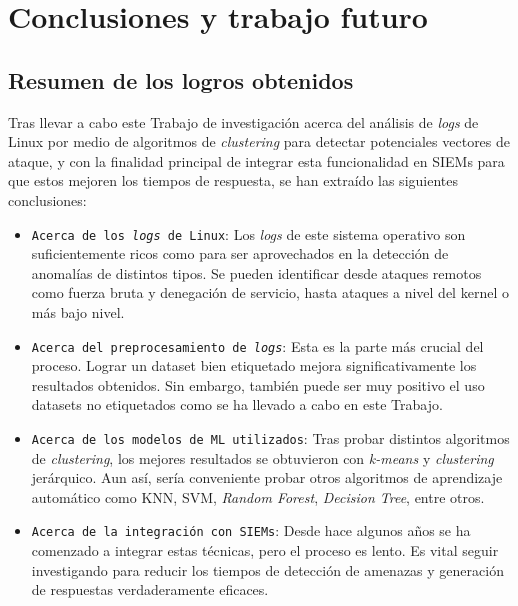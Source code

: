 \chapter{Conclusiones y trabajo futuro}


\vspace{-5mm}

\section{Resumen de los logros obtenidos}

Tras llevar a cabo este Trabajo de investigación acerca del análisis de \textit{logs} de Linux por medio de algoritmos de \textit{clustering} para detectar potenciales vectores de ataque, y con la finalidad principal de integrar esta funcionalidad en \gls{SIEM}s para que estos mejoren los tiempos de respuesta, se han extraído las siguientes conclusiones:

\begin{itemize}
\item \texttt{Acerca de los \textit{logs} de Linux}: Los \textit{logs} de este sistema operativo son suficientemente ricos como para ser aprovechados en la detección de anomalías de distintos tipos. Se pueden identificar desde ataques remotos como fuerza bruta y denegación de servicio, hasta ataques a nivel del kernel o más bajo nivel. \\
\item \texttt{Acerca del preprocesamiento de \textit{logs}}: Esta es la parte más crucial del proceso. Lograr un dataset bien etiquetado mejora significativamente los resultados obtenidos. Sin embargo, también puede ser muy positivo el uso datasets no etiquetados como se ha llevado a cabo en este Trabajo. \\
\item \texttt{Acerca de los modelos de \gls{ML} utilizados}: Tras probar distintos algoritmos de \textit{clustering}, los mejores resultados se obtuvieron con \textit{k-means} y \textit{clustering} jerárquico. Aun así, sería conveniente probar otros algoritmos de aprendizaje automático como \gls{KNN}, \gls{SVM}, \textit{Random Forest}, \textit{Decision Tree}, entre otros. \\
\item \texttt{Acerca de la integración con \gls{SIEM}s}: Desde hace algunos años se ha comenzado a integrar estas técnicas, pero el proceso es lento. Es vital seguir investigando para reducir los tiempos de detección de amenazas y generación de respuestas verdaderamente eficaces.
\end{itemize}

